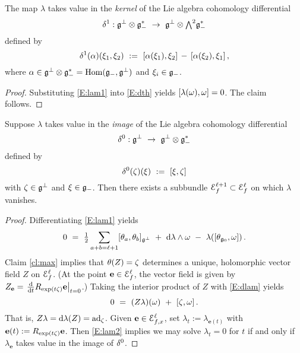 \documentclass[12pt]{amsart}
\numberwithin{equation}{section}
\numberwithin{table}{section}
\numberwithin{figure}{section}
\begin{document}
\begin{claim}\label{cl:ker}
The map $\lambda$ takes value in the \emph{kernel} of the Lie algebra cohomology \cite{MR0142696} differential 
\[
  \d^1 : \fg^\perp \ot \fg_-^* \ \to \ 
  \fg^\perp \ot \tw^2 \fg_-^*
\]
defined by
\[
  \d^1(\a)(\xi_1,\xi_2) \ := \ 
  [ \a(\xi_1) , \xi_2] \,-\, [\a(\xi_2) , \xi_1] \,,
\]
where $\alpha \in {\mathfrak{g}}^\perp \otimes {\mathfrak{g}}_-^* = \mathrm{Hom}({\mathfrak{g}}_-,{\mathfrak{g}}^\perp)$ and $\xi_i \in {\mathfrak{g}}_-$.
\end{claim}

\begin{proof}
Substituting \eqref{E:lam1} into \eqref{E:dth} yields $[\lambda(\omega) , \omega] = 0$.  The claim follows.   
\end{proof}

\begin{claim} \label{cl:im}
Suppose $\lambda$ takes value in the \emph{image} of the Lie algebra cohomology differential
\[
  \d^0 : \fg^\perp \ \to \ \fg^\perp \ot \fg_-^*
\]
defined by 
\[
  \delta^0(\zeta)(\xi) \ := \ [\xi,\zeta]
\]
with $\zeta \in {\mathfrak{g}}^\perp$ and $\xi\in{\mathfrak{g}}_-$.  Then there exists a subbundle $\mathcal E_f^{\ell+1} \subset \mathcal E_f^\ell$ on which $\lambda$ vanishes.
\end{claim}

\begin{proof} 
Differentiating \eqref{E:lam1} yields
\begin{equation}\label{E:dlam}
  0 \ = \ 
  \half \sum_{a+b=\ell+1} [ \theta_a , \theta_b ]_{\fg^\perp} \ + \ 
  \td \lambda \wedge \w \ - \ \lambda( [\theta_{\fg_0} , \w] ) \,.
\end{equation}
Claim \ref{cl:max} implies that $\theta(Z) = \zeta$ determines a unique, holomorphic vector field $Z$ on $\mathcal E_f^\ell$.  (At the point $\mathbf{e} \in \mathcal E_f^\ell$, the vector field is given by $Z_\mathbf{e} = \left.\frac{\mathrm{d}}{\mathrm{d} t} R_{\exp(t\zeta)} \mathbf{e} \right|_{t=0}$.) Taking the interior product of $Z$ with \eqref{E:dlam} yields
\begin{equation}\label{E:lam2}
  0 \ = \ (Z\lambda)(\omega) \ + \ [\zeta,\omega] \,.
\end{equation}
That is, $Z\lambda = \mathrm{d} \lambda(Z) = \mathrm{ad}_\zeta$.  Given $\mathbf{e} \in \mathcal E_{f,x}^\ell$, set $\lambda_t := \lambda_{\mathbf{e}(t)}$ with $\mathbf{e}(t) := R_{\exp(t\zeta)} \mathbf{e}$.  Then \eqref{E:lam2} implies we may solve $\lambda_t = 0$ for $t$ if and only if $\lambda_\mathbf{e}$ takes value in the image of $\delta^0$.
\end{proof}
\end{document}
